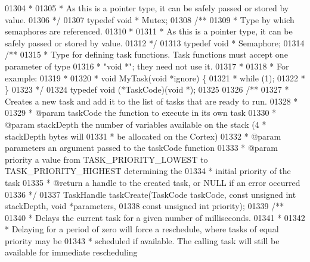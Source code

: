 \begin{DoxyCode}
{{{{{{{{{01304 \textcolor{comment}{ *}
01305 \textcolor{comment}{ * As this is a pointer type, it can be safely passed or stored by value.}
01306 \textcolor{comment}{ */}
01307 \textcolor{keyword}{typedef} \textcolor{keywordtype}{void} * Mutex;
01308 \textcolor{comment}{/**}
01309 \textcolor{comment}{ * Type by which semaphores are referenced.}
01310 \textcolor{comment}{ *}
01311 \textcolor{comment}{ * As this is a pointer type, it can be safely passed or stored by value.}
01312 \textcolor{comment}{ */}
01313 \textcolor{keyword}{typedef} \textcolor{keywordtype}{void} * Semaphore;
01314 \textcolor{comment}{/**}
01315 \textcolor{comment}{ * Type for defining task functions. Task functions must accept one parameter of type}
01316 \textcolor{comment}{ * "void *"; they need not use it.}
01317 \textcolor{comment}{ *}
01318 \textcolor{comment}{ * For example:}
01319 \textcolor{comment}{ *}
01320 \textcolor{comment}{ * void MyTask(void *ignore) \{}
01321 \textcolor{comment}{ *     while (1);}
01322 \textcolor{comment}{ * \}}
01323 \textcolor{comment}{ */}
01324 \textcolor{keyword}{typedef} \textcolor{keywordtype}{void} (*TaskCode)(\textcolor{keywordtype}{void} *);
01325 
01326 \textcolor{comment}{/**}
01327 \textcolor{comment}{ * Creates a new task and add it to the list of tasks that are ready to run.}
01328 \textcolor{comment}{ *}
01329 \textcolor{comment}{ * @param taskCode the function to execute in its own task}
01330 \textcolor{comment}{ * @param stackDepth the number of variables available on the stack (4 * stackDepth bytes will}
01331 \textcolor{comment}{ * be allocated on the Cortex)}
01332 \textcolor{comment}{ * @param parameters an argument passed to the taskCode function}
01333 \textcolor{comment}{ * @param priority a value from TASK\_PRIORITY\_LOWEST to TASK\_PRIORITY\_HIGHEST determining the}
01334 \textcolor{comment}{ * initial priority of the task}
01335 \textcolor{comment}{ * @return a handle to the created task, or NULL if an error occurred}
01336 \textcolor{comment}{ */}
01337 TaskHandle taskCreate(TaskCode taskCode, \textcolor{keyword}{const} \textcolor{keywordtype}{unsigned} \textcolor{keywordtype}{int} stackDepth, \textcolor{keywordtype}{void} *parameters,
01338        \textcolor{keyword}{const} \textcolor{keywordtype}{unsigned} \textcolor{keywordtype}{int} priority);
01339 \textcolor{comment}{/**}
01340 \textcolor{comment}{ * Delays the current task for a given number of milliseconds.}
01341 \textcolor{comment}{ *}
01342 \textcolor{comment}{ * Delaying for a period of zero will force a reschedule, where tasks of equal priority may be}
01343 \textcolor{comment}{ * scheduled if available. The calling task will still be available for immediate rescheduling}
}}}}}}}}}
\end{DoxyCode}
